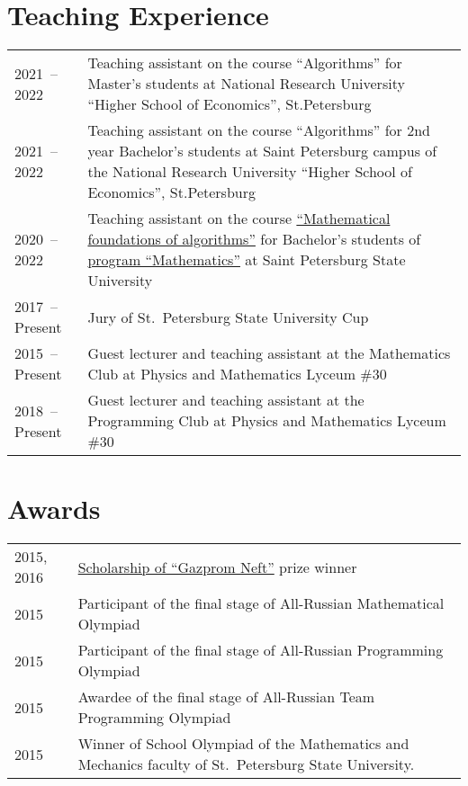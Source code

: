 \documentclass[a4paper, 11pt]{article}
\begin{document}
\section*{Teaching Experience}

\begin{tabularx}{\textwidth}{lX}
	2021~-- 2022 & Teaching assistant on the course ``Algorithms'' for Master's students at National Research University ``Higher School of Economics'', St.Petersburg \\

	2021~-- 2022 & Teaching assistant on the course ``Algorithms'' for 2nd year Bachelor's students at Saint Petersburg campus of the National Research University ``Higher School of Economics'', St.Petersburg  \\

	2020~-- 2022 & Teaching assistant on the course \href{https://users.math-cs.spbu.ru/~okhotin/teaching/algorithms_2020/}{``Mathematical foundations of algorithms''} for Bachelor's students of \href{https://math-cs.spbu.ru/en/}{program ``Mathematics''} at Saint Petersburg State University \\

	2017~-- Present & Jury of St.~Petersburg State University Cup \\

	2015~-- Present & Guest lecturer and teaching assistant at the Mathematics Club at Physics and Mathematics Lyceum \#30 \\

	2018~-- Present & Guest lecturer and teaching assistant at the Programming Club at Physics and Mathematics Lyceum \#30
\end{tabularx}

\section*{Awards}

\begin{tabularx}{\textwidth}{lX}
	2015, 2016 & \href{https://math-cs.spbu.ru/en/scholarships-rodnye-goroda/}{Scholarship of ``Gazprom Neft''} prize winner \\

	2015 & Participant of the final stage of All-Russian Mathematical Olympiad \\

	2015 & Participant of the final stage of All-Russian Programming Olympiad \\

	2015 & Awardee of the final stage of All-Russian Team Programming Olympiad \\

	2015 & Winner of School Olympiad of the Mathematics and Mechanics faculty of St.~Petersburg State University.
\end{tabularx}
\end{document}
